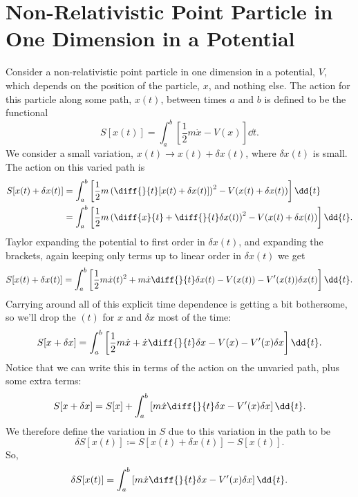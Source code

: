 \section[Non-Relativistic Point Particle in One Dimension in a Potential][First Example]{Non-Relativistic Point Particle in One Dimension in a Potential}
Consider a non-relativistic point particle in one dimension in a potential, \(V\), which depends on the position of the particle, \(x\), and nothing else.
The action for this particle along some path, \(x(t)\), between times \(a\) and \(b\) is defined to be the functional
\begin{equation}
    S[x(t)] = \int_a^b \left[ \frac{1}{2}m\dot{x} - V(x) \right] \dd{t}.
\end{equation}
We consider a small variation, \(x(t) \to x(t) + \delta x(t)\), where \(\delta x(t)\) is small.
The action on this varied path is
\begin{align}
    S[x(t) + \delta x(t)] &= \int_a^b \left[ \frac{1}{2}m \left( \diff{}{t} [x(t) + \delta x(t)] \right)^2 - V(x(t) + \delta x(t)) \right] \dd{t} \notag\\
    &= \int_a^b \left[ \frac{1}{2}m\left( \diff{x}{t} + \diff{}{t}\delta x(t) \right)^2 - V(x(t) + \delta x(t)) \right] \dd{t}.
\end{align}
Taylor expanding the potential to first order in \(\delta x(t)\), and expanding the brackets, again keeping only terms up to linear order in \(\delta x(t)\) we get
\begin{equation}
    S[x(t) + \delta x(t)] = \int_a^b \left[ \frac{1}{2}m\dot{x}(t)^2 + m\dot{x} \diff{}{t}\delta x(t) - V(x(t)) - V'(x(t))\delta x(t) \right] \dd{t}.
\end{equation}
Carrying around all of this explicit time dependence is getting a bit bothersome, so we'll drop the \((t)\) for \(x\) and \(\delta x\) most of the time:
\begin{equation}
    S[x + \delta x] = \int_a^b \left[ \frac{1}{2}m \dot{x} + \dot{x} \diff{}{t}\delta x - V(x) - V'(x)\delta x \right] \dd{t}.
\end{equation}
Notice that we can write this in terms of the action on the unvaried path, plus some extra terms:
\begin{equation}
    S[x + \delta x] = S[x] + \int_a^b \left[ m \dot{x} \diff{}{t}\delta x - V'(x)\delta x \right] \dd{t}.
\end{equation}
We therefore define the variation in \(S\) due to this variation in the path to be
\begin{equation}
    \delta S[x(t)] \coloneqq S[x(t) + \delta x(t)] - S[x(t)].
\end{equation}
So,
\begin{equation}\label{eqn:variation in action}
    \delta S[x(t)] = \int_a^b \left[ m \dot{x} \diff{}{t}\delta x - V'(x)\delta x \right] \dd{t}.
\end{equation}

